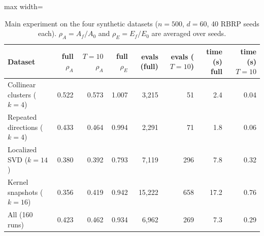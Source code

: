 \begin{table}[t]
\centering\small
\caption{Main experiment on the four synthetic datasets ($n=500$, $d=60$, 40 RBRP seeds each). $\rho_A=A_f/A_0$ and $\rho_E=E_f/E_0$ are averaged over seeds.}\label{tab:pilot}
\begin{adjustbox}{max width=\linewidth}
\begin{tabular}{lrrrrrrr}
\toprule
Dataset & full $\rho_A$ & $T{=}10$ $\rho_A$ & full $\rho_E$ & evals (full) & evals ($T{=}10$) & time (s) full & time (s) $T{=}10$ \\
\midrule
Collinear clusters ($k=4$) & 0.522 & 0.573 & 1.007 & 3,215 & 51 & 2.4 & 0.04 \\
Repeated directions ($k=4$) & 0.433 & 0.464 & 0.994 & 2,291 & 71 & 1.8 & 0.06 \\
Localized SVD ($k=14$) & 0.380 & 0.392 & 0.793 & 7,119 & 296 & 7.8 & 0.32 \\
Kernel snapshots ($k=16$) & 0.356 & 0.419 & 0.942 & 15,222 & 658 & 17.2 & 0.76 \\
All (160 runs) & 0.423 & 0.462 & 0.934 & 6,962 & 269 & 7.3 & 0.29 \\
\bottomrule
\end{tabular}
\end{adjustbox}
\end{table}
